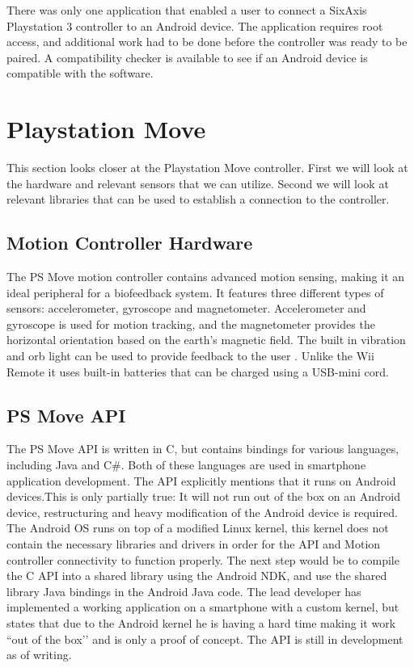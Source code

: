 There was only one application \cite{sixaxisController} that enabled a user to connect a SixAxis Playstation 3 controller to an Android device. The application requires root access, and additional work had to be done before the controller was ready to be paired. A compatibility checker is available to see if an Android device is compatible with the software.

\section{Playstation Move}
This section looks closer at the Playstation Move controller. First we will look at the hardware and relevant sensors that we can utilize. Second we will look at relevant libraries that can be used to establish a connection to the controller.

\subsection{Motion Controller Hardware}
The PS Move motion controller contains advanced motion sensing, making it an ideal peripheral for a biofeedback system. It features three different types of sensors: accelerometer, gyroscope and magnetometer. Accelerometer and gyroscope is used for motion tracking, and the magnetometer provides the horizontal orientation based on the earth’s magnetic field. The built in vibration and orb light can be used to provide feedback to the user \cite{psMoveTech}. Unlike the Wii Remote it uses built-in batteries that can be charged using a USB-mini cord. 

\subsection{PS Move API}
The PS Move API \cite{PSMoveAPI} is written in C, but contains bindings for various languages, including Java and C\#. Both of these languages are used in smartphone application development. The API explicitly mentions that it runs on Android devices.This is only partially true: It will not run out of the box on an Android device, restructuring and heavy modification of the Android device is required. The Android OS runs on top of a modified Linux kernel, this kernel does not contain the necessary libraries and drivers in order for the API and Motion controller connectivity to function properly. The next step would be to compile the C API into a shared library using the Android NDK, and use the shared library Java bindings in the Android Java code. The lead developer has implemented a working application on a smartphone with a custom kernel, but states that due to the Android kernel he is having a hard time making it work ``out of the box’’ and is only a proof of concept. The API is still in development as of writing.

